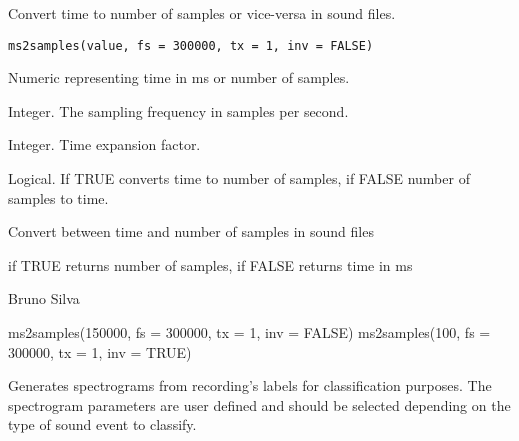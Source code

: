 \documentclass[letterpaper]{book}
\begin{document}
%
\begin{Description}\relax
Convert time to number of samples or vice-versa
in sound files.
\end{Description}
%
\begin{Usage}
\begin{verbatim}
ms2samples(value, fs = 300000, tx = 1, inv = FALSE)
\end{verbatim}
\end{Usage}
%
\begin{Arguments}
\begin{ldescription}
\item[\code{value}] Numeric representing time in ms or number of samples.

\item[\code{fs}] Integer. The sampling frequency in samples per second.

\item[\code{tx}] Integer. Time expansion factor.

\item[\code{inv}] Logical. If TRUE converts time to number of samples, if FALSE
number of samples to time.
\end{ldescription}
\end{Arguments}
%
\begin{Details}\relax
Convert between time and number of samples in sound files
\end{Details}
%
\begin{Value}
if TRUE returns number of samples, if FALSE
returns time in ms
\end{Value}
%
\begin{Author}\relax
Bruno Silva
\end{Author}
%
\begin{Examples}
\begin{ExampleCode}
ms2samples(150000, fs = 300000, tx = 1, inv = FALSE)
ms2samples(100, fs = 300000, tx = 1, inv = TRUE)
\end{ExampleCode}
\end{Examples}
%
\begin{Description}\relax
Generates spectrograms from recording's labels for
classification purposes. The spectrogram parameters are user defined
and should be selected depending on the type of sound event to classify.
\end{Description}
\end{document}

